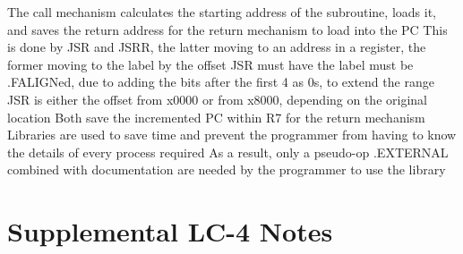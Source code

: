 \documentclass[11 pt, twoside]{article}
\newenvironment{outline*}
{
	\begin{outline}[enumerate]
	}
	{\end{outline}
}
\begin{document}
\begin{outline*}
\2 The call mechanism calculates the starting address of the subroutine, loads it, and saves the return address for the return mechanism to load into the PC
\2 This is done by JSR and JSRR, the latter moving to an address in a register, the former moving to the label by the offset
\3 JSR must have the label must be .FALIGNed, due to adding the bits after the first 4 as 0s, to extend the range
\3 JSR is either the offset from x0000 or from x8000, depending on the original location
\3 Both save the incremented PC within R7 for the return mechanism
\2 Libraries are used to save time and prevent the programmer from having to know the details of every process required
\3 As a result, only a pseudo-op .EXTERNAL combined with documentation are needed by the programmer to use the library
\end{outline*}
\section{Supplemental LC-4 Notes}
\end{document}

